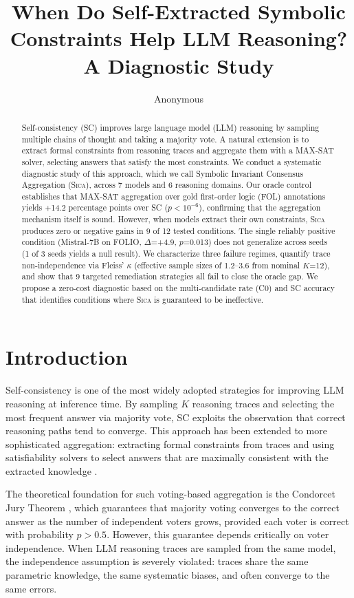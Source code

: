 \documentclass[11pt,a4paper]{article}
\title{When Do Self-Extracted Symbolic Constraints Help LLM Reasoning?\\A Diagnostic Study}
\author{Anonymous}
\date{}
\newcommand{\sica}{\textsc{Sica}}
\newcommand{\pp}{\text{pp}}
\begin{document}
\maketitle

\begin{abstract}
Self-consistency (SC) improves large language model (LLM) reasoning by sampling multiple chains of thought and taking a majority vote.
A natural extension is to extract formal constraints from reasoning traces and aggregate them with a MAX-SAT solver, selecting answers that satisfy the most constraints.
We conduct a systematic diagnostic study of this approach, which we call Symbolic Invariant Consensus Aggregation (\sica{}), across 7 models and 6 reasoning domains.
Our oracle control establishes that MAX-SAT aggregation over gold first-order logic (FOL) annotations yields +14.2 percentage points over SC ($p < 10^{-6}$), confirming that the aggregation mechanism itself is sound.
However, when models extract their own constraints, \sica{} produces zero or negative gains in 9 of 12 tested conditions.
The single reliably positive condition (Mistral-7B on FOLIO, $\Delta$=+4.9\pp{}, $p$=0.013) does not generalize across seeds (1 of 3 seeds yields a null result).
We characterize three failure regimes, quantify trace non-independence via Fleiss' $\kappa$ (effective sample sizes of 1.2--3.6 from nominal $K$=12), and show that 9 targeted remediation strategies all fail to close the oracle gap.
We propose a zero-cost diagnostic based on the multi-candidate rate (C0) and SC accuracy that identifies conditions where \sica{} is guaranteed to be ineffective.
\end{abstract}

\section{Introduction}

Self-consistency \citep{wang2023selfconsistency} is one of the most widely adopted strategies for improving LLM reasoning at inference time.
By sampling $K$ reasoning traces and selecting the most frequent answer via majority vote, SC exploits the observation that correct reasoning paths tend to converge.
This approach has been extended to more sophisticated aggregation: extracting formal constraints from traces and using satisfiability solvers to select answers that are maximally consistent with the extracted knowledge \citep{pan2023logiclm,olausson2023linc}.

The theoretical foundation for such voting-based aggregation is the Condorcet Jury Theorem \citep{condorcet1785}, which guarantees that majority voting converges to the correct answer as the number of independent voters grows, provided each voter is correct with probability $p > 0.5$.
However, this guarantee depends critically on voter independence.
When LLM reasoning traces are sampled from the same model, the independence assumption is severely violated: traces share the same parametric knowledge, the same systematic biases, and often converge to the same errors.
\end{document}
